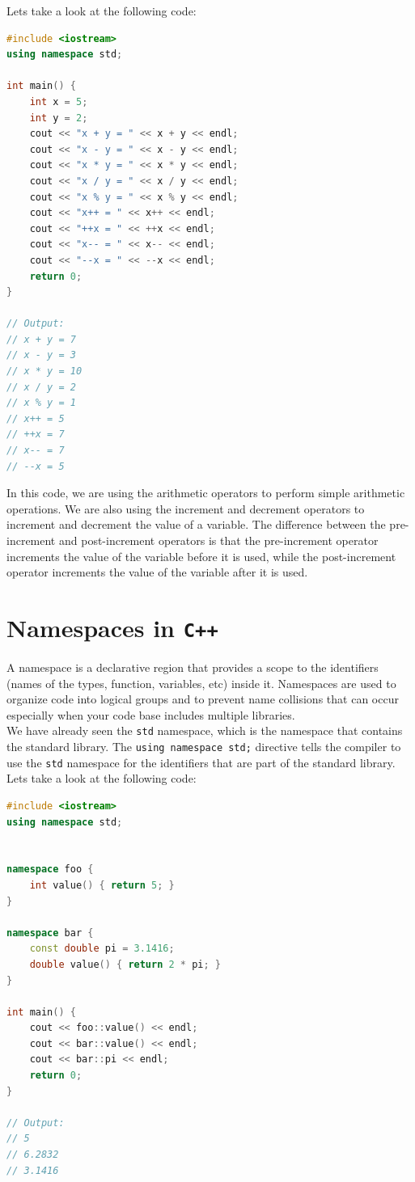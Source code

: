 Lets take a look at the following code:

\begin{lstlisting}[language=C++]
#include <iostream>
using namespace std;

int main() {
    int x = 5;
    int y = 2;
    cout << "x + y = " << x + y << endl;
    cout << "x - y = " << x - y << endl;
    cout << "x * y = " << x * y << endl;
    cout << "x / y = " << x / y << endl;
    cout << "x % y = " << x % y << endl;
    cout << "x++ = " << x++ << endl;
    cout << "++x = " << ++x << endl;
    cout << "x-- = " << x-- << endl;
    cout << "--x = " << --x << endl;
    return 0;
}

// Output:
// x + y = 7
// x - y = 3
// x * y = 10
// x / y = 2
// x % y = 1
// x++ = 5
// ++x = 7
// x-- = 7
// --x = 5
\end{lstlisting}

In this code, we are using the arithmetic operators to perform simple arithmetic operations. We are also
using the increment and decrement operators to increment and decrement the value of a variable. The difference
between the pre-increment and post-increment operators is that the pre-increment operator increments the value
of the variable before it is used, while the post-increment operator increments the value of the variable after
it is used.\\

\section{Namespaces in \texttt{C++}}

A namespace is a declarative region that provides a scope to the identifiers (names of the types, function,
variables, etc) inside it. Namespaces are used to organize code into logical groups and to prevent name
collisions that can occur especially when your code base includes multiple libraries.\\

We have already seen the \texttt{std} namespace, which is the namespace that contains the standard library.
The \texttt{using namespace std;} directive tells the compiler to use the \texttt{std} namespace for the
identifiers that are part of the standard library.\\

Lets take a look at the following code:

\begin{lstlisting}[language=C++]
#include <iostream>
using namespace std;


namespace foo {
    int value() { return 5; }
}

namespace bar {
    const double pi = 3.1416;
    double value() { return 2 * pi; }
}

int main() {
    cout << foo::value() << endl;
    cout << bar::value() << endl;
    cout << bar::pi << endl;
    return 0;
}

// Output:
// 5
// 6.2832
// 3.1416
\end{lstlisting}

